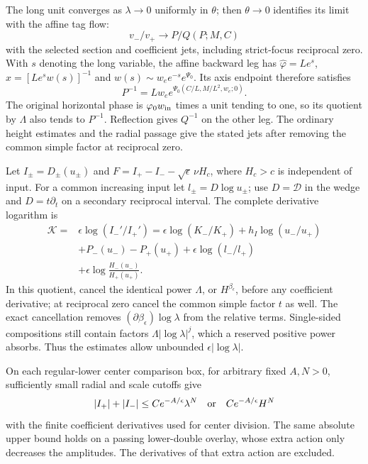 The long unit converges as $\lambda\to0$ uniformly in $\theta$;
then $\theta\to0$ identifies its limit with the affine tag flow:
\begin{equation}\label{rw:secondary:phase-ratio}
 v_-/v_+\longrightarrow P/Q(P;M,C)
\end{equation}
with the selected section and coefficient jets, including
strict-focus reciprocal zero. With $s$ denoting the long variable,
the affine backward leg has $\hat\varphi=Le^s$,
$\hat x=[Le^sw(s)]^{-1}$ and
$w(s)\sim w_e e^{-s}e^{\Psi_0}$. Its axis endpoint therefore satisfies
\[
 P^{-1}=Lw_e e^{\Psi_0(C/L,M/L^2,w_e;0)}.
\]
The original horizontal phase is $\varphi_0w_{\rm in}$ times a unit
tending to one, so its quotient by $\Lambda$ also tends to $P^{-1}$.
Reflection gives $Q^{-1}$ on the other leg.
The ordinary height estimates and the radial passage give the stated
jets after removing the common simple factor at reciprocal zero.

Let $I_\pm=D_\pm(u_\pm)$ and
$F=I_+-I_--\sqrt\epsilon\,\nu H_c$, where $H_c>c$ is independent
of input. For a common increasing input let
$l_\pm=D\log u_\pm$; use $D=\mathcal D$ in the wedge and
$D=t\partial_t$ on a secondary reciprocal interval.
The complete derivative logarithm is
\begin{equation}\label{rw:secondary:complete-log}
\begin{aligned}
 \mathcal K={}&\epsilon\log(I_-'/I_+')
 =\epsilon\log(K_-/K_+)+h_I\log(u_-/u_+)\\
 &+P_-(u_-)-P_+(u_+)+\epsilon\log(l_-/l_+)\\
 &+\epsilon\log\frac{H_-(u_-)}{H_+(u_+)} .
\end{aligned}
\end{equation}
In this quotient, cancel the identical power $\Lambda$, or
$H^{\beta_\epsilon}$, before any coefficient derivative; at reciprocal
zero cancel the common simple factor $t$ as well. The exact cancellation
removes $(\partial\beta_\epsilon)\log\lambda$ from the relative terms.
Single-sided compositions still contain factors
$\Lambda|\log\lambda|^j$, which a reserved positive power absorbs.
Thus the estimates allow unbounded $\epsilon|\log\lambda|$.

\begin{lemma}\label{rw:secondary:flat-budget}
On each regular-lower center comparison box, for arbitrary fixed
$A,N>0$, sufficiently small radial and scale cutoffs give
\[
 |I_+|+|I_-|\le Ce^{-A/\epsilon}\lambda^N
 \quad\hbox{or}\quad Ce^{-A/\epsilon}H^N
\]
with the finite coefficient derivatives used for center division.
The same absolute upper bound holds on a passing lower-double
overlay, whose extra action only decreases the amplitudes.
The derivatives of that extra action are excluded.
\end{lemma}

